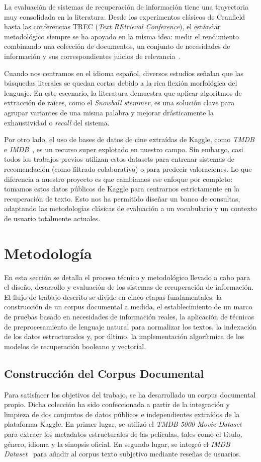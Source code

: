 \documentclass[conference,a4paper]{IEEEtran}
\begin{document}
La evaluación de sistemas de recuperación de información tiene una trayectoria muy consolidada en la literatura. Desde los experimentos clásicos de Cranfield hasta las conferencias TREC (\textit{Text REtrieval Conference}), el estándar metodológico siempre se ha apoyado en la misma idea: medir el rendimiento combinando una colección de documentos, un conjunto de necesidades de información y sus correspondientes juicios de relevancia~\cite{b1}.

Cuando nos centramos en el idioma español, diversos estudios señalan que las búsquedas literales se quedan cortas debido a la rica flexión morfológica del lenguaje. En este escenario, la literatura demuestra que aplicar algoritmos de extracción de raíces, como el \textit{Snowball stemmer}, es una solución clave para agrupar variantes de una misma palabra y mejorar drásticamente la exhaustividad o \textit{recall} del sistema.

Por otro lado, el uso de bases de datos de cine extraídas de Kaggle, como \textit{TMDB} e \textit{IMDB}~\cite{b4,b5}, es un recurso super explotado en nuestro campo. Sin embargo, casi todos los trabajos previos utilizan estos datasets para entrenar sistemas de recomendación (como filtrado colaborativo) o para predecir valoraciones. Lo que diferencia a nuestro proyecto es que cambiamos ese enfoque por completo: tomamos estos datos públicos de Kaggle para centrarnos estrictamente en la recuperación de texto. Esto nos ha permitido diseñar un banco de consultas, adaptando las metodologías clásicas de evaluación a un vocabulario y un contexto de usuario totalmente actuales.

\section{Metodología}

En esta sección se detalla el proceso técnico y metodológico llevado a cabo para 
el diseño, desarrollo y evaluación de los sistemas de recuperación de información. 
El flujo de trabajo descrito se divide en cinco etapas fundamentales: la 
construcción de un corpus documental a medida, el establecimiento de un marco 
de pruebas basado en necesidades de información reales, la aplicación de técnicas 
de preprocesamiento de lenguaje natural para normalizar los textos, la indexación 
de los datos estructurados y, por último, la implementación algorítmica de los 
modelos de recuperación booleano y vectorial.

\subsection{Construcción del Corpus Documental}
Para satisfacer los objetivos del trabajo, se ha desarrollado un corpus documental propio. Dicha colección ha sido confeccionada a partir de la integración y limpieza de dos conjuntos de datos públicos e independientes extraídos de la plataforma Kaggle. En primer lugar, se utilizó el \textit{TMDB 5000 Movie Dataset}~\cite{b4} para extraer los metadatos estructurales de las películas, tales como el título, género, idioma y la sinopsis oficial. En segundo lugar, se integró el \textit{IMDB Dataset}~\cite{b5} para añadir al corpus texto subjetivo mediante reseñas de usuarios.
\end{document}
